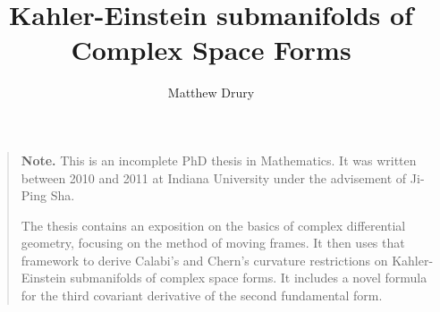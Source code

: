 \documentclass[11pt]{amsart}
\title{ Kahler-Einstein submanifolds of Complex Space Forms }
\author{ Matthew Drury }
\theoremstyle{definition}
\begin{document}
\maketitle

\parskip 6pt
\parindent 0pt
\baselineskip 14pt

\begin{quote}
\textbf{Note.}
This is an incomplete PhD thesis in Mathematics. It was written between 2010
and 2011 at Indiana University under the advisement of Ji-Ping Sha.

The thesis contains an exposition on the basics of complex differential
geometry, focusing on the method of moving frames. It then uses that framework
to derive Calabi's and Chern's curvature restrictions on Kahler-Einstein
submanifolds of complex space forms. It includes a novel formula for the third
covariant derivative of the second fundamental form.
\end{quote}

\tableofcontents











\vfill



\bigskip
\end{document}
